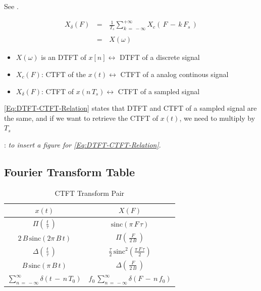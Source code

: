 See \cite{signal_processing_Lathi}.

\begin{equation}
\begin{array}{lll}
X_{\delta}(F) \, &=& \, \displaystyle\frac{1}{T_s} \displaystyle\sum\limits_{k \, = \, -\infty}^{+ \infty} X_c \left(\, F \, - \, k \,F_s  \,\right) \\ \\
                &=& \, X(\omega)
\end{array}
\label{Eq:DTFT-CTFT-Relation}
\end{equation}

\begin{itemize}
    \item $X(\omega)$ is an DTFT of $x[n] \leftrightarrow$ DTFT of a discrete signal
    
    \item $X_c(F)$: CTFT of the $x(t) \leftrightarrow$ CTFT of a analog continous signal
    
    \item $X_{\delta}(F)$: CTFT of $x(n \, T_s) \leftrightarrow$ CTFT of a sampled signal 
    
\end{itemize}

\autoref{Eq:DTFT-CTFT-Relation} states that DTFT and CTFT of a sampled signal are the same, and if we want to retrieve the CTFT of $x(t)$, we need to multiply by $T_s$

: \textit{to insert a figure for \autoref{Eq:DTFT-CTFT-Relation}}.


\subsection{Fourier Transform Table}

\begin{table}[!h]
	\centering
\begin{tabular}{|c|c|} \hline
$x(t)$  & $X(F)$ \\ \hline 
$\Pi\displaystyle \left( \, \frac{t}{\tau} \,\right)$ & $\text{sinc} (\pi \, F \, \tau)$ \\ \hline
$2\, B \, \text{sinc}(2 \pi \, B \, t)$ & $\Pi\displaystyle \left( \, \frac{F}{2 \, B} \,\right) $\\ \hline
$\Delta\displaystyle \left( \, \frac{t}{\tau} \,\right)$ & $ \displaystyle\frac{\tau}{2} \, \text{sinc}^2 \left( \displaystyle\frac{\pi \, F \, \tau}{2}   \right)$ \\ \hline
$ B \, \text{sinc}(\pi \, B \, t)$ & $\Delta\displaystyle \left( \, \frac{F}{2 \, B} \,\right) $\\ \hline
 $\displaystyle\sum_{n \, = \, - \infty}^\infty \delta(t \, - \, n \, T_0)$ & $ f_0 \, \displaystyle\sum_{n \, = \, - \infty}^\infty \delta(F \, - \, n \, f_0)$ \\ \hline
\end{tabular}
\caption{CTFT Transform Pair}
\label{Tb:Fourier_Processing:CTFT_Table}
\end{table} 

